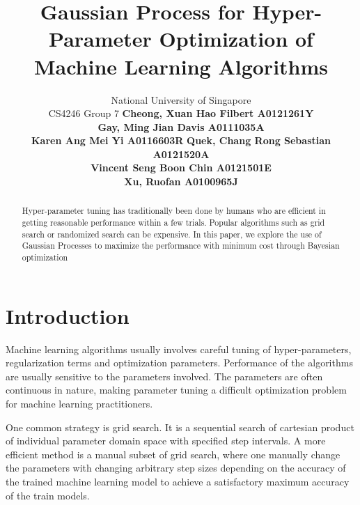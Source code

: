 \documentclass[letterpaper]{article}
\begin{document}
%
\title{Gaussian Process for Hyper-Parameter Optimization of Machine Learning Algorithms}
\author{
National University of Singapore \\
CS4246 Group 7 \AND
\normalsize\normalfont\textbf{Cheong, Xuan Hao Filbert A0121261Y} \\
\normalsize\normalfont\textbf{Gay, Ming Jian Davis A0111035A} \\
\normalsize\normalfont\textbf{Karen Ang Mei Yi A0116603R} \And
\normalsize\normalfont\textbf{Quek, Chang Rong Sebastian A0121520A} \\
\normalsize\normalfont\textbf{Vincent Seng Boon Chin A0121501E} \\
\normalsize\normalfont\textbf{Xu, Ruofan A0100965J}
}

\maketitle
\begin{abstract}
Hyper-parameter tuning has traditionally been done by humans who are efficient in getting reasonable performance within a few trials. Popular algorithms such as grid search or randomized search can be expensive. In this paper, we explore the use of Gaussian Processes to maximize the performance with minimum cost through Bayesian optimization
\end{abstract}

\section{Introduction}
\noindent Machine learning algorithms usually involves careful tuning of hyper-parameters, regularization terms and optimization parameters. Performance of the algorithms are usually sensitive to the parameters involved. The parameters are often continuous in nature, making parameter tuning a difficult optimization problem for machine learning practitioners.

One common strategy is grid search. It is a sequential search of cartesian product of individual parameter domain space with specified step intervals. A more efficient method is a manual subset of grid search, where one manually change the parameters with changing arbitrary step sizes depending on the accuracy of the trained machine learning model to achieve a satisfactory maximum accuracy of the train models.
\end{document}
